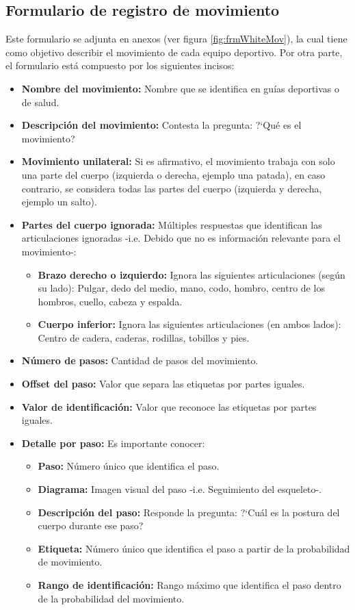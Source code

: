 \subsection{Formulario de registro de movimiento} \label{ins:frmMov}
Este formulario se adjunta en anexos (ver figura \ref{fig:frmWhiteMov}), la cual tiene como objetivo describir el movimiento de cada equipo deportivo. Por otra parte, el formulario est\'a compuesto por los siguientes incisos:
\begin{itemize}
	\item \textbf{Nombre del movimiento:} Nombre que se identifica en gu\'ias deportivas o de salud.
	\item \textbf{Descripci\'on del movimiento: } Contesta la pregunta: ?`Qu\'e es el movimiento?
	\item \textbf{Movimiento unilateral:} Si es afirmativo, el movimiento trabaja con solo una parte del cuerpo (izquierda o derecha, ejemplo una patada), en caso contrario, se considera todas las partes del cuerpo (izquierda y derecha, ejemplo un salto).
	\item \textbf{Partes del cuerpo ignorada:} M\'ultiples respuestas que identifican las articulaciones ignoradas -i.e. Debido que no es informaci\'on relevante para el movimiento-:
	\begin{itemize}
		\item \textbf{Brazo derecho o izquierdo:} Ignora las siguientes articulaciones (seg\'un su lado): Pulgar, dedo del medio, mano, codo, hombro, centro de los hombros, cuello, cabeza y espalda.
		\item \textbf{Cuerpo inferior:} Ignora las siguientes articulaciones (en ambos lados): Centro de cadera, caderas, rodillas, tobillos y pies.
	\end{itemize}
		\item \textbf{N\'umero de pasos:} Cantidad de pasos del movimiento.
		\item \textbf{Offset del paso:} Valor que separa las etiquetas por partes iguales.
		\item \textbf{Valor de identificaci\'on:} Valor que reconoce las etiquetas por partes iguales.
		\item \textbf{Detalle por paso:} Es  importante conocer:
			\begin{itemize}
		\item \textbf{Paso:} N\'umero \'unico que identifica el paso.
		\item \textbf{Diagrama:} Imagen visual del paso -i.e. Seguimiento del esqueleto-.
		\item \textbf{Descripci\'on del paso:} Responde la pregunta: ?`Cu\'al es la postura del cuerpo durante ese paso?
		\item \textbf{Etiqueta:} N\'umero \'unico que identifica el paso a partir de la probabilidad de movimiento.
	\item \textbf{Rango de identificaci\'on:} Rango m\'aximo que identifica el paso dentro de la probabilidad del movimiento.
	\end{itemize}
\end{itemize}
